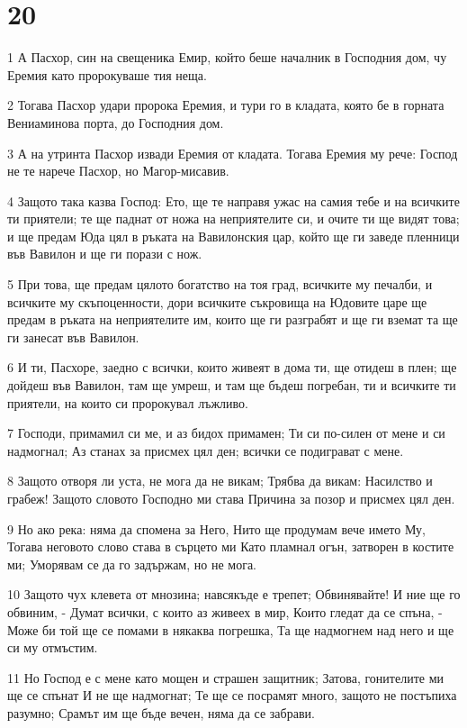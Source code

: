\chapter{20}

\par 1 А Пасхор, син на свещеника Емир, който беше началник в Господния дом, чу Еремия като пророкуваше тия неща.
\par 2 Тогава Пасхор удари пророка Еремия, и тури го в кладата, която бе в горната Вениаминова порта, до Господния дом.
\par 3 А на утринта Пасхор извади Еремия от кладата. Тогава Еремия му рече: Господ не те нарече Пасхор, но Магор-мисавив.
\par 4 Защото така казва Господ: Ето, ще те направя ужас на самия тебе и на всичките ти приятели; те ще паднат от ножа на неприятелите си, и очите ти ще видят това; и ще предам Юда цял в ръката на Вавилонския цар, който ще ги заведе пленници във Вавилон и ще ги порази с нож.
\par 5 При това, ще предам цялото богатство на тоя град, всичките му печалби, и всичките му скъпоценности, дори всичките съкровища на Юдовите царе ще предам в ръката на неприятелите им, които ще ги разграбят и ще ги вземат та ще ги занесат във Вавилон.
\par 6 И ти, Пасхоре, заедно с всички, които живеят в дома ти, ще отидеш в плен; ще дойдеш във Вавилон, там ще умреш, и там ще бъдеш погребан, ти и всичките ти приятели, на които си пророкувал лъжливо.
\par 7 Господи, примамил си ме, и аз бидох примамен; Ти си по-силен от мене и си надмогнал; Аз станах за присмех цял ден; всички се подиграват с мене.
\par 8 Защото отворя ли уста, не мога да не викам; Трябва да викам: Насилство и грабеж! Защото словото Господно ми става Причина за позор и присмех цял ден.
\par 9 Но ако река: няма да спомена за Него, Нито ще продумам вече името Му, Тогава неговото слово става в сърцето ми Като пламнал огън, затворен в костите ми; Уморявам се да го задържам, но не мога.
\par 10 Защото чух клевета от мнозина; навсякъде е трепет; Обвинявайте! И ние ще го обвиним, - Думат всички, с които аз живеех в мир, Които гледат да се спъна, - Може би той ще се помами в някаква погрешка, Та ще надмогнем над него и ще си му отмъстим.
\par 11 Но Господ е с мене като мощен и страшен защитник; Затова, гонителите ми ще се спънат И не ще надмогнат; Те ще се посрамят много, защото не постъпиха разумно; Срамът им ще бъде вечен, няма да се забрави.
